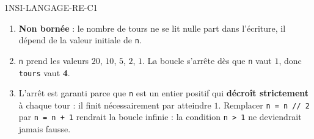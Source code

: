 \begin{corrige}{1NSI-LANGAGE-RE-C1}
\begin{enumerate}
  \item \textbf{Non bornée} : le nombre de tours ne se lit nulle part dans l'écriture, il
        dépend de la valeur initiale de \lstinline{n}.
  \item \lstinline{n} prend les valeurs $20$, $10$, $5$, $2$, $1$. La boucle s'arrête dès que
        \lstinline{n} vaut $1$, donc \lstinline{tours} vaut \textbf{4}.
  \item L'arrêt est garanti parce que \lstinline{n} est un entier positif qui
        \textbf{décroît strictement} à chaque tour : il finit nécessairement par atteindre $1$.
        Remplacer \lstinline{n = n // 2} par \lstinline{n = n + 1} rendrait la boucle infinie :
        la condition \lstinline{n > 1} ne deviendrait jamais fausse.
\end{enumerate}
\end{corrige}
